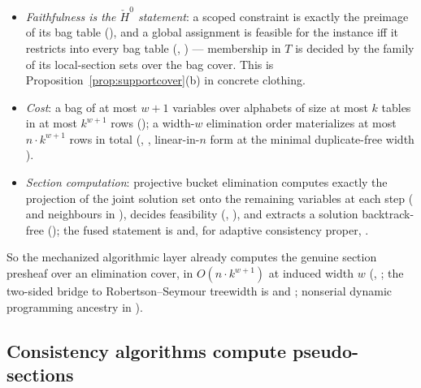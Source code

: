 \documentclass[11pt]{article}
\newcommand{\Hech}{\check H}
\begin{document}
\begin{itemize}
\item \emph{Faithfulness is the $\Hech^0$ statement}: a scoped
  constraint is exactly the preimage of its bag table
  (), and a global assignment is
  feasible for the instance iff it restricts into every bag table
  (,
  ) --- membership in $T$ is decided by
  the family of its local-section sets over the bag cover.  This is
  Proposition~\ref{prop:supportcover}(b) in concrete clothing.
\item \emph{Cost}: a bag of at most $w+1$ variables over alphabets of
  size at most $k$ tables in at most $k^{w+1}$ rows
  (); a width-$w$ elimination order
  materializes at most $n \cdot k^{w+1}$ rows in total
  (,
  , linear-in-$n$ form
   at the minimal duplicate-free
  width ).
\item \emph{Section computation}: projective bucket elimination
  computes exactly the projection of the joint solution set onto the
  remaining variables at each step
  ( and neighbours in
  ), decides feasibility
  (,
  ), and extracts a solution
  backtrack-free
  (); the fused
  statement is  and, for
  adaptive consistency proper, 
  \citep{dechter1999bucket,dechter2003constraint,dechterpearl1987network}.
\end{itemize}

So the mechanized algorithmic layer already computes the genuine
section presheaf over an elimination cover, in $O(n \cdot k^{w+1})$
at induced width $w$ (,
; the two-sided bridge to
Robertson--Seymour treewidth \citep{robertson1986graphminorsII} is
 and
; nonserial dynamic
programming ancestry in \citet{bertele1972nonserial}).

\subsection{Consistency algorithms compute pseudo-sections}
\end{document}

